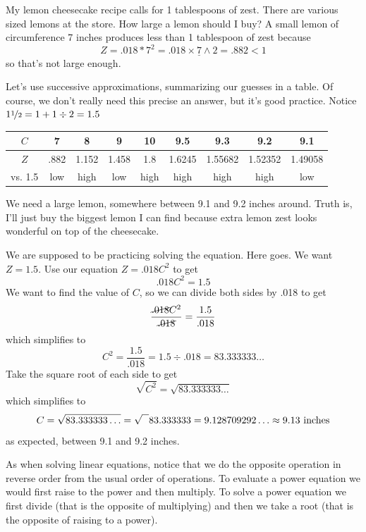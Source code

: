 My lemon cheesecake recipe calls for 1 tablespoons of zest.  There are various sized lemons at the store.  How large a lemon should I buy?  A small lemon of circumference 7 inches produces less than 1 tablespoon of zest because 
$$Z=.018\ast7^2 = .018 \times \underline{7} \wedge 2 = .882 < 1$$
so that's not large enough.  

Let's use successive approximations, summarizing our guesses in a table.  Of course, we don't really need this precise an answer, but it's good practice. Notice $1\nicefrac{1}{2} = 1 + 1 \div 2 = 1.5$
\begin{center}
\begin{tabular} {|c| |c|c |c|c|c|c |c|c|} \hline
$C$ & 7 & 8 & 9 & 10 & 9.5 & 9.3 & 9.2 & 9.1\\ \hline
$Z$ & .882 & 1.152 & 1.458 & 1.8 & 1.6245 & 1.55682 & 1.52352 & 1.49058\\ \hline
vs. 1.5 & low & high & low & high & high & high & high & low\\ \hline
\end{tabular}
\end{center}
We need a large lemon, somewhere between 9.1 and 9.2  inches around.
Truth is, I'll just buy the biggest lemon I can find because extra lemon zest looks wonderful on top of the cheesecake.

We are supposed to be practicing solving the equation.  Here goes.  We want $Z=1.5$.  Use our equation $Z=.018C^2$ to get 
$$.018C^2=1.5$$ 
We want to find the value of $C$, so we can divide both sides by .018 to get 
$$\frac{\cancel{.018}C^2}{\cancel{.018}}=\frac{1.5}{.018}$$  
which simplifies to $$C^2 = \frac{1.5}{.018}= 1.5 \div .018 = 83.333333\ldots$$ 
Take the square root of each side to get
 $$\sqrt{C^2} = \sqrt{83.333333\ldots}$$
 which simplifies to 
$$C = \sqrt{83.333333\ldots} =\sqrt{\text{\raisebox{.6em}{~\text{  }}}} 83.333333
 = 9.128709292\ldots \approx 9.13 \text{ inches}$$  
as expected, between 9.1 and 9.2 inches.  

As when solving linear equations, notice that we do the opposite operation in reverse order from the usual order of operations.  To evaluate a power equation we would first raise to the power and then multiply.  To solve a power equation we first divide (that is the opposite of multiplying) and then we take a root (that is the opposite of raising to a power).

